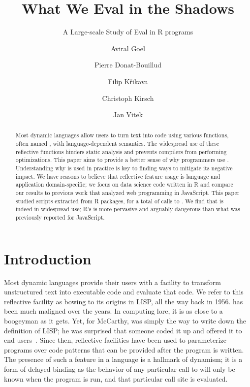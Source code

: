 \documentclass[screen,acmsmall]{acmart}
\begin{document}
\title{What We Eval in the Shadows}
\subtitle{A Large-scale Study of Eval in R programs}

\author{Aviral Goel}
\author{Pierre Donat-Bouillud}
\author{Filip Křikava}
\author{Christoph Kirsch}
\author{Jan Vitek}

\begin{abstract}
  \noindent Most dynamic languages allow users to turn text into code using
  various functions, often named \eval, with language-dependent semantics. The
  widespread use of these reflective functions hinders static analysis and
  prevents compilers from performing optimizations. This paper aims to provide a
  better sense of why programmers use \eval. Understanding why \eval is used in
  practice is key to finding ways to mitigate its negative impact. We have
  reasons to believe that reflective feature usage is language and application
  domain-specific; we focus on data science code written in R and compare our
  results to previous work that analyzed web programming in JavaScript. This
  paper studied \CranRunnableScripts scripts extracted from \CranPackages R
  packages, for a total of \packageAllcalls calls to \eval. We find that \eval
  is indeed in widespread use; R's \eval is more pervasive and arguably
  dangerous than what was previously reported for JavaScript.
\end{abstract}

\maketitle
\renewcommand{\shortauthors}{A. Goel, P. Donat-Bouillud, F. Křikava, C. Kirsch and J. Vitek}

\section{Introduction}

Most dynamic languages provide their users with a facility to transform
unstructured text into executable code and evaluate that code. We refer to this
reflective facility as \eval bowing to its origins in LISP, all the way back in
1956. \Eval has been much maligned over the years. In computing lore, it is as
close to a boogeyman as it gets. Yet, for McCarthy, \eval was simply the way to
write down the definition of LISP; he was surprised that someone coded it up and
offered it to end users~\cite{lisp}. Since then, reflective facilities have been
used to parameterize programs over code patterns that can be provided after the
program is written. The presence of such a feature in a language is a hallmark
of dynamism; it is a form of delayed binding as the behavior of any particular
call to \eval will only be known when the program is run, and that particular
call site is evaluated.
\end{document}
